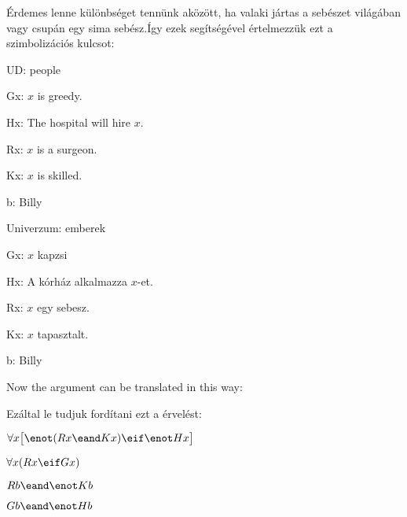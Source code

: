 Érdemes lenne különbséget tennünk aközött, ha valaki jártas a sebészet világában vagy csupán egy sima sebész.Így ezek segítségével értelmezzük ezt a szimbolizációs kulcsot:
\begin{ekey}
\item[UD:] people
\item[Gx:] $x$ is greedy.
\item[Hx:] The hospital will hire $x$.
\item[Rx:] $x$ is a surgeon.
\item[Kx:] $x$ is skilled.
\item[b:] Billy
\end{ekey}

\begin{ekey}
\item[Univerzum:] emberek
\item[Gx:] $x$ kapzsi
\item[Hx:] A kórház alkalmazza $x$-et.
\item[Rx:] $x$ egy sebesz.
\item[Kx:] $x$ tapasztalt.
\item[b:] Billy
\end{ekey}

Now the argument can be translated in this way:

Ezáltal le tudjuk fordítani ezt a érvelést:
\begin{earg}
\label{surgeon2}
\item[] $\forall x\bigl[\enot (Rx \eand Kx) \eif \enot Hx\bigr]$
\item[] $\forall x(Rx \eif Gx)$
\item[] $Rb \eand \enot Kb$
\item[\therefore] $Gb \eand \enot Hb$
\end{earg}




